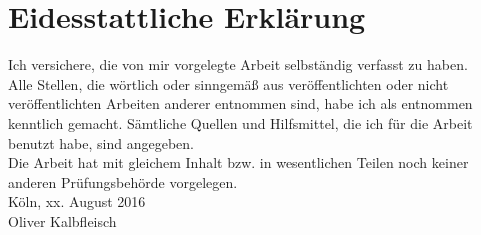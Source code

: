 \chapter*{Eidesstattliche Erklärung}

Ich versichere, die von mir vorgelegte Arbeit selbständig verfasst zu haben.\\ 
Alle Stellen, die wörtlich oder sinngemäß aus veröffentlichten oder nicht veröffentlichten Arbeiten anderer entnommen sind, habe ich als entnommen kenntlich gemacht. Sämtliche Quellen und Hilfsmittel, die ich für die Arbeit benutzt habe, sind angegeben.\\ 
Die Arbeit hat mit gleichem Inhalt bzw. in wesentlichen Teilen noch keiner anderen Prüfungsbehörde vorgelegen.
\vspace{1.5cm}
\\
Köln, xx. August 2016
\vspace{3cm}
\\
Oliver Kalbfleisch


